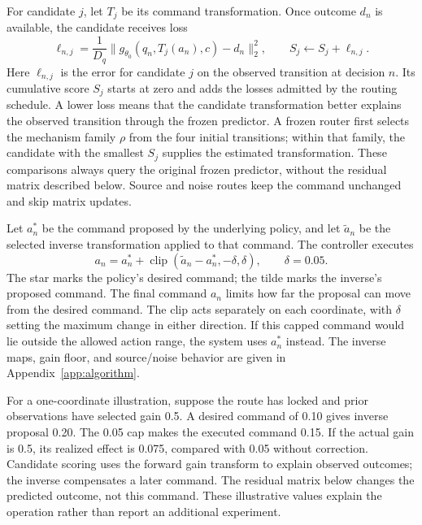 For candidate $j$, let $T_j$ be its command transformation. Once outcome $d_n$
is available, the candidate receives loss
\begin{equation}
 \ell_{n,j}=\frac{1}{D_q}
 \|g_{\theta_0}(q_n,T_j(a_n),c)-d_n\|_2^2,
 \qquad S_j\leftarrow S_j+\ell_{n,j}.
 \label{eq:scores}
\end{equation}
Here $\ell_{n,j}$ is the error for candidate $j$ on the observed transition
at decision $n$. Its cumulative score $S_j$ starts at zero and adds the losses
admitted by the routing schedule. A lower loss means that the candidate transformation better explains the
observed transition through the frozen predictor.
A frozen router first selects the mechanism family $\rho$ from the four
initial transitions; within that family, the candidate with the smallest
$S_j$ supplies the estimated transformation. These comparisons always query
the original frozen predictor, without the residual matrix described below.
Source and noise routes keep the command unchanged and skip matrix updates.

Let $a_n^*$ be the command proposed by the underlying policy, and let
$\tilde a_n$ be the selected inverse transformation applied to that command.
The controller executes
\begin{equation}
 a_n=a_n^*+\operatorname{clip}(\tilde a_n-a_n^*,-\delta,\delta),
 \qquad \delta=0.05.
 \label{eq:command}
\end{equation}
The star marks the policy's desired command; the tilde marks the inverse's
proposed command. The final command $a_n$ limits how far the proposal can move
from the desired command. The clip acts separately on each coordinate, with
$\delta$ setting the maximum change in either direction.
If this capped command would lie outside the allowed action range, the system
uses $a_n^*$ instead. The inverse maps, gain floor, and source/noise behavior
are given in Appendix~\ref{app:algorithm}.

For a one-coordinate illustration, suppose the route has locked and prior
observations have selected gain 0.5. A desired command of 0.10 gives inverse
proposal 0.20. The 0.05 cap makes the executed command 0.15. If the actual gain
is 0.5, its realized effect is 0.075, compared with 0.05 without correction.
Candidate scoring uses the forward gain transform to explain observed outcomes;
the inverse compensates a later command. The residual matrix below changes the
predicted outcome, not this command. These illustrative values explain the
operation rather than report an additional experiment.

